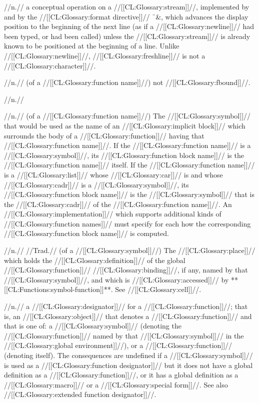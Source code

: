  //n.// a conceptual operation on a //[[CL:Glossary:stream]]//, implemented by  and by the //[[CL:Glossary:format directive]]// \f{~\&}, which advances the display position to the beginning of the next line (as if a //[[CL:Glossary:newline]]// had been typed, or  had been called) unless the //[[CL:Glossary:stream]]// is already known to be positioned at the beginning of a line. Unlike //[[CL:Glossary:newline]]//, //[[CL:Glossary:freshline]]// is not a //[[CL:Glossary:character]]//.

 //n.// (of a //[[CL:Glossary:function name]]//) not //[[CL:Glossary:fbound]]//.

 //n.// %

 //n.// (of a //[[CL:Glossary:function name]]//) The //[[CL:Glossary:symbol]]// that would be used as the name of an //[[CL:Glossary:implicit block]]// which surrounds the body of a //[[CL:Glossary:function]]// having that //[[CL:Glossary:function name]]//. If the //[[CL:Glossary:function name]]// is a //[[CL:Glossary:symbol]]//, its //[[CL:Glossary:function block name]]// is the //[[CL:Glossary:function name]]// itself. If the //[[CL:Glossary:function name]]// is a //[[CL:Glossary:list]]// whose //[[CL:Glossary:car]]// is  and whose //[[CL:Glossary:cadr]]// is a //[[CL:Glossary:symbol]]//, its //[[CL:Glossary:function block name]]// is the //[[CL:Glossary:symbol]]// that is the //[[CL:Glossary:cadr]]// of the //[[CL:Glossary:function name]]//. An //[[CL:Glossary:implementation]]// which supports additional kinds of //[[CL:Glossary:function names]]// must specify for each how the corresponding //[[CL:Glossary:function block name]]// is computed.

 //n.// //Trad.// (of a //[[CL:Glossary:symbol]]//) The //[[CL:Glossary:place]]// which holds the //[[CL:Glossary:definition]]// of the global //[[CL:Glossary:function]]// //[[CL:Glossary:binding]]//, if any, named by that //[[CL:Glossary:symbol]]//, and which is //[[CL:Glossary:accessed]]// by **[[CL:Functions:symbol-function]]**. See //[[CL:Glossary:cell]]//.

 //n.// a //[[CL:Glossary:designator]]// for a //[[CL:Glossary:function]]//; that is, an //[[CL:Glossary:object]]// that denotes a //[[CL:Glossary:function]]// and that is one of: a //[[CL:Glossary:symbol]]// (denoting the //[[CL:Glossary:function]]// named by that //[[CL:Glossary:symbol]]// in the //[[CL:Glossary:global environment]]//), or a //[[CL:Glossary:function]]// (denoting itself). The consequences are undefined if a //[[CL:Glossary:symbol]]// is used as a //[[CL:Glossary:function designator]]// but it does not have a global definition as a //[[CL:Glossary:function]]//, or it has a global definition as a //[[CL:Glossary:macro]]// or a //[[CL:Glossary:special form]]//. See also //[[CL:Glossary:extended function designator]]//.

